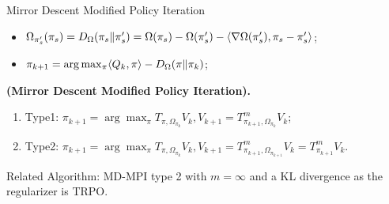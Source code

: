 \documentclass{beamer}
\begin{document}
\begin{frame}[t]{Mirror Descent Modified Policy Iteration}
    \begin{itemize}
        \item $ \Omega_{\pi'_{s}}(\pi_s) = D_{\Omega}(\pi_s \Arrowvert \pi'_{s}) = \Omega(\pi_s) - \Omega(\pi'_s) - \langle \nabla \Omega(\pi'_s), \pi_s - \pi'_s \rangle $;
        \item $ \pi_{k+1} = \arg\max_{\pi} \langle Q_k, \pi \rangle - D_{\Omega}(\pi \Arrowvert \pi_k) $;
    \end{itemize}
    \begin{definition}
        \textbf{(Mirror Descent Modified Policy Iteration).}
        \begin{enumerate}
            \item Type1: $ \pi_{k+1} = \arg\max_{\pi} T_{\pi, \Omega_{\pi_k}}V_k, V_{k+1}=T^{m}_{\pi_{k+1}, \Omega_{\pi_k}}V_k$;       
            \item Type2: $ \pi_{k+1} =  \arg\max_{\pi} T_{\pi, \Omega_{\pi_k}}V_k, V_{k+1}=T^{m}_{\pi_{k+1}, \Omega_{\pi_{k+1}}}V_k = T^{m}_{\pi_{k+1}} V_k $.
        \end{enumerate}
    \end{definition}
    Related Algorithm: {MD-MPI} type 2 with $ m = \infty $ and a KL divergence as the regularizer is {TRPO}.
\end{frame}
\end{document}

